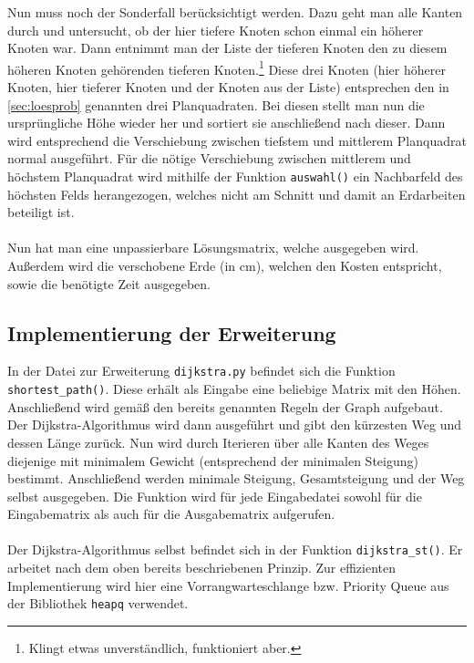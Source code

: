 \documentclass[a4paper, notitlepage, 12pt]{scrartcl}
\begin{document}
Nun muss noch der Sonderfall berücksichtigt werden. Dazu geht man alle Kanten durch und untersucht, ob der hier tiefere Knoten schon einmal ein höherer Knoten war. Dann entnimmt man der Liste der tieferen Knoten den zu diesem höheren Knoten gehörenden tieferen Knoten.\footnote{Klingt etwas unverständlich, funktioniert aber.} Diese drei Knoten (hier höherer Knoten, hier tieferer Knoten und der Knoten aus der Liste) entsprechen den in \autoref{sec:loesprob} genannten drei Planquadraten. Bei diesen stellt man nun die ursprüngliche Höhe wieder her und sortiert sie anschließend nach dieser. Dann wird entsprechend die Verschiebung zwischen tiefstem und mittlerem Planquadrat normal ausgeführt. Für die nötige Verschiebung zwischen mittlerem und höchstem Planquadrat wird mithilfe der Funktion \texttt{auswahl()} ein Nachbarfeld des höchsten Felds herangezogen, welches nicht am Schnitt und damit an Erdarbeiten beteiligt ist. \\ \\
Nun hat man eine unpassierbare Lösungsmatrix, welche ausgegeben wird. Außerdem wird die verschobene Erde (in cm), welchen den Kosten entspricht, sowie die benötigte Zeit ausgegeben.
\subsection{Implementierung der Erweiterung}
In der Datei zur Erweiterung \texttt{dijkstra.py} befindet sich die Funktion \texttt{shortest\_path()}. Diese erhält als Eingabe eine beliebige Matrix mit den Höhen. Anschließend wird gemäß den bereits genannten Regeln der Graph aufgebaut. Der Dijkstra-Algorithmus wird dann ausgeführt und gibt den kürzesten Weg und dessen Länge zurück. Nun wird durch Iterieren über alle Kanten des Weges diejenige mit minimalem Gewicht (entsprechend der minimalen Steigung) bestimmt. Anschließend werden minimale Steigung, Gesamtsteigung und der Weg selbst ausgegeben. Die Funktion wird für jede Eingabedatei sowohl für die Eingabematrix als auch für die Ausgabematrix aufgerufen. \\ \\
Der Dijkstra-Algorithmus selbst befindet sich in der Funktion \texttt{dijkstra\_st()}. Er arbeitet nach dem oben bereits beschriebenen Prinzip. Zur effizienten Implementierung wird hier eine Vorrangwarteschlange bzw. Priority Queue aus der Bibliothek \texttt{heapq} verwendet.
 \newpage
\end{document}
